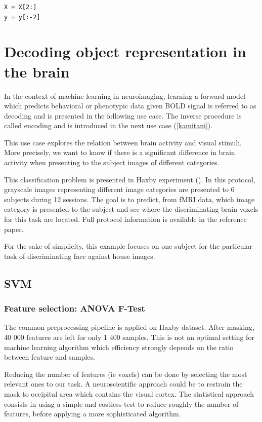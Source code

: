 \documentclass{frontiersSCNS} %
\newcounter{x}
\newcounter{y}
\begin{document}
\begin{lstlisting}
X = X[2:]
y = y[:-2]
\end{lstlisting}

\section{Decoding object representation in the brain}

In the context of machine learning in neuroimaging, learning a forward model
which predicts behavioral or phenotypic data given BOLD signal is referred to as
decoding and is presented in the following use case. The inverse procedure is
called encoding \cite{Naselaris2011} and is introduced in the next use case
(\ref{kamitani}).

This use case explores the relation between brain activity and visual
stimuli. More precisely, we want to know if there is a significant difference
in brain activity when presenting to the subject images of different categories.

This classification problem is presented in Haxby experiment (\cite{haxby2001}).
In this protocol, grayscale images representing different image categories
are presented to 6 subjects during 12 sessions. The goal is to predict,
from fMRI data, which image category is presented
to the subject and see where the discriminating brain voxels for this task are
located. Full protocol information is available in the reference paper.

For the sake of simplicity, this example focuses on one subject for the
particular task of discriminating face against house images.

\subsection{SVM}

\subsubsection{Feature selection: ANOVA F-Test}

The common preprocessing pipeline is applied on Haxby dataset. After masking, 40
000 features are left for only 1 400 samples. This is not an optimal setting
for machine learning algorithm which efficiency strongly depends on the ratio
between feature and samples.

Reducing the number of features (ie voxels) can be done by selecting the most
relevant ones to our task. A neuroscientific approach could be to restrain the
mask to occipital area which contains the visual cortex. The statistical
approach consists in using a simple and costless test to reduce roughly the
number of features, before applying a more sophisticated algorithm.
\end{document}
